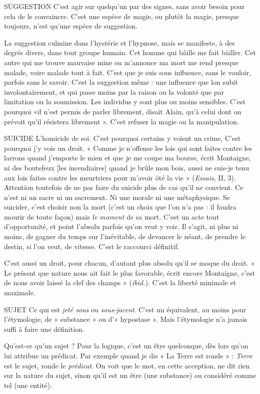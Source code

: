 SUGGESTION C'est agir sur quelqu'un par des signes, sans avoir besoin
pour cela de le convaincre. C’est une espèce de magie, ou
plutôt la magie, presque toujours, n’est qu’une espèce de suggestion.

La suggestion culmine dans l’hystérie et l'hypnose, mais se manifeste, à des
degrés divers, dans tout groupe humain. Cet homme qui bâille me fait bäiller.
Cet autre qui me trouve mauvaise mine ou m’annonce ma mort me rend
presque malade, voire malade tout à fait. C’est que je suis sous influence, sans
le vouloir, parfois sans le savoir. C’est la suggestion même : une influence que
lon subit involontairement, et qui passe moins par la raison ou la volonté que
par limitation ou la soumission. Les individus y sont plus ou moins sensibles.
C’est pourquoi «il n’est permis de parler librement, disait Alain, qu’à celui
dont on prévoit qu’il résistera librement ». C’est refuser la magie ou la manipulation.

SUICIDE  L’homicide de soi. C’est pourquoi certains y voient un crime,
C’est pourquoi j'y vois un droit. « Comme je n’offense les lois qui
sont faites contre les larrons quand j’emporte le mien et que je me coupe ma
bourse, écrit Montaigne, ni des boutefeux [les incendiaires] quand je brûle
mon bois, aussi ne suis-je tenu aux lois faites contre les meurtriers pour m'avoir
ôté la vie » ({\it Essais}, II, 3). Attention toutefois de ne pas faire du suicide plus de
cas qu’il ne convient. Ce n’est ni un sacre ni un sacrement. Ni une morale ni
une métaphysique. Se suicider, c’est choisir non la mort (c’est un choix que
l’on n’a pas : il faudra mourir de toute façon) mais {\it le moment} de sa mort. C’est
un acte tout d'opportunité, et point l’absolu parfois qu’on veut y voir. Il s’agit,
ni plus ni moins, de gagner du temps sur l’inévitable, de devancer le néant, de
prendre le destin, si l’on veut, de vitesse. C’est le raccourci définitif.

C’est aussi un droit, pour chacun, d’autant plus absolu qu’il se moque du
droit. « Le présent que nature nous ait fait le plus favorable, écrit encore Montaigne,
c'est de nous avoir laissé la clef des champs » ({\it ibid.}). C’est la liberté
minimale et maximale.

SUJET Ce qui est {\it jeté sous} ou {\it sous-jacent}. C’est un équivalent, au moins pour
l'étymologie, de « substance » ou d’« hypostase ». Mais l’étymologie
n'a jamais suffi à faire une définition.

Qu'est-ce qu’un sujet ? Pour la logique, c’est un être quelconque, dès lors
qu'on lui attribue un prédicat. Par exemple quand je dis « La Terre est ronde » :
{\it Terre} est le sujet, ronde le {\it prédicat}. On voit que le mot, en cette acception, ne
dit rien sur la nature du sujet, sinon qu’il est un être (une substance) ou considéré
comme tel (une entité).

